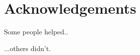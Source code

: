 %
%

\chapter*{Acknowledgements}
\begin{SingleSpace}
Some people helped..

\vspace{100mm}
\hspace{120mm}
...others didn't.
\end{SingleSpace}
\clearpage